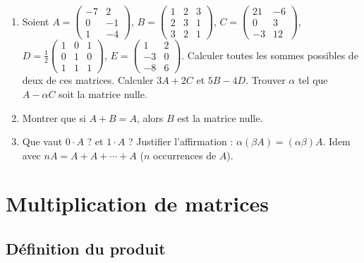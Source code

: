 \documentclass[class=report,crop=false]{standalone}
\begin{document}
\begin{miniexercices}
\sauteligne
\begin{enumerate}
  \item Soient
  $A=\left(\begin{smallmatrix}-7&2\\0&-1\\1&-4\end{smallmatrix}\right)$,
  $B=\left(\begin{smallmatrix}1&2&3\\2&3&1\\3&2&1\end{smallmatrix}\right)$,
  $C=\left(\begin{smallmatrix}21&-6\\0&3\\-3&12\end{smallmatrix}\right)$,
  $D=\frac12\left(\begin{smallmatrix}1&0&1\\0&1&0\\1&1&1\end{smallmatrix}\right)$,
  $E=\left(\begin{smallmatrix}1&2\\-3&0\\-8&6\end{smallmatrix}\right)$.
  Calculer toutes les sommes possibles de deux de ces matrices.
  Calculer $3A+2C$ et $5B-4D$. Trouver $\alpha$ tel que $A-\alpha C$ soit la matrice nulle.

  \item Montrer que si $A+B=A$, alors $B$ est la matrice nulle.

  \item Que vaut $0\cdot A$ ? et $1\cdot A$ ? Justifier l'affirmation : $\alpha(\beta A) = (\alpha\beta)A$.
  Idem avec $nA = A+A+\cdots+A$ ($n$ occurrences de $A$).

\end{enumerate}
\end{miniexercices}


\section{Multiplication de matrices}

\subsection{Définition du produit}
\end{document}

